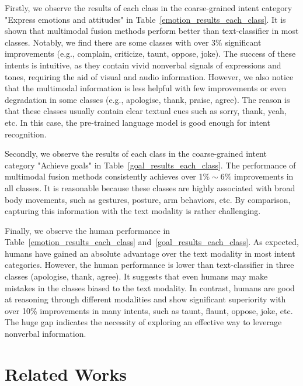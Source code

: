 \documentclass[sigconf,camera-ready]{acmart}
\begin{document}
Firstly, we observe the results of each class in the coarse-grained intent category "Express emotions and attitudes" in Table~\ref{emotion_results_each_class}. It is shown that multimodal fusion methods perform better than text-classifier in most classes. Notably, we find there are some classes with over $3\%$ significant improvements (e.g., complain, criticize, taunt, oppose, joke). The success of these intents is intuitive, as they contain vivid nonverbal signals of expressions and tones, requiring the aid of visual and audio information. However, we also notice that the multimodal information is less helpful with few improvements or even degradation in some classes (e.g., apologise, thank, praise, agree). The reason is that these classes usually contain clear textual cues such as sorry, thank, yeah, etc. In this case, the pre-trained language model is good enough for intent recognition. 



Secondly, we observe the results of each class in the coarse-grained intent category "Achieve goals" in Table~\ref{goal_results_each_class}. The performance of multimodal fusion methods consistently achieves over 1$\%\sim6\%$ improvements in all classes. It is reasonable because these classes are highly associated with broad body movements, such as gestures, posture, arm behaviors, etc. By comparison, capturing this information with the text modality is rather challenging. 

Finally, we observe the human performance in Table~\ref{emotion_results_each_class} and~\ref{goal_results_each_class}. As expected, humans have gained an absolute advantage over the text modality in most intent categories. However, the human performance is lower than text-classifier in three classes (apologise, thank, agree). It suggests that even humans may make mistakes in the classes biased to the text modality. In contrast, humans are good at reasoning through different modalities and show significant superiority with over 10\% improvements in many intents, such as taunt, flaunt, oppose, joke, etc. The huge gap indicates the necessity of exploring an effective way to leverage nonverbal information.

\section{Related Works}
\end{document}
